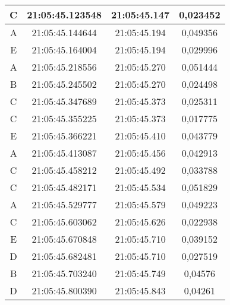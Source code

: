 \begin{table}[!h]
\begin{tabular}{|ccc|c|}
  \multicolumn{1}{|c|}{C}    & \multicolumn{1}{c|}{21:05:45.123548} & 21:05:45.147       & 0,023452      \\ \hline
  \multicolumn{1}{|c|}{A}    & \multicolumn{1}{c|}{21:05:45.144644} & 21:05:45.194       & 0,049356      \\ \hline
  \multicolumn{1}{|c|}{E}    & \multicolumn{1}{c|}{21:05:45.164004} & 21:05:45.194       & 0,029996      \\ \hline
  \multicolumn{1}{|c|}{A}    & \multicolumn{1}{c|}{21:05:45.218556} & 21:05:45.270       & 0,051444      \\ \hline
  \multicolumn{1}{|c|}{B}    & \multicolumn{1}{c|}{21:05:45.245502} & 21:05:45.270       & 0,024498      \\ \hline
  \multicolumn{1}{|c|}{C}    & \multicolumn{1}{c|}{21:05:45.347689} & 21:05:45.373       & 0,025311      \\ \hline
  \multicolumn{1}{|c|}{C}    & \multicolumn{1}{c|}{21:05:45.355225} & 21:05:45.373       & 0,017775      \\ \hline
  \multicolumn{1}{|c|}{E}    & \multicolumn{1}{c|}{21:05:45.366221} & 21:05:45.410       & 0,043779      \\ \hline
  \multicolumn{1}{|c|}{A}    & \multicolumn{1}{c|}{21:05:45.413087} & 21:05:45.456       & 0,042913      \\ \hline
  \multicolumn{1}{|c|}{C}    & \multicolumn{1}{c|}{21:05:45.458212} & 21:05:45.492       & 0,033788      \\ \hline
  \multicolumn{1}{|c|}{C}    & \multicolumn{1}{c|}{21:05:45.482171} & 21:05:45.534       & 0,051829      \\ \hline
  \multicolumn{1}{|c|}{A}    & \multicolumn{1}{c|}{21:05:45.529777} & 21:05:45.579       & 0,049223      \\ \hline
  \multicolumn{1}{|c|}{C}    & \multicolumn{1}{c|}{21:05:45.603062} & 21:05:45.626       & 0,022938      \\ \hline
  \multicolumn{1}{|c|}{E}    & \multicolumn{1}{c|}{21:05:45.670848} & 21:05:45.710       & 0,039152      \\ \hline
  \multicolumn{1}{|c|}{D}    & \multicolumn{1}{c|}{21:05:45.682481} & 21:05:45.710       & 0,027519      \\ \hline
  \multicolumn{1}{|c|}{B}    & \multicolumn{1}{c|}{21:05:45.703240} & 21:05:45.749       & 0,04576       \\ \hline
  \multicolumn{1}{|c|}{D}    & \multicolumn{1}{c|}{21:05:45.800390} & 21:05:45.843       & 0,04261       \\ \hline

\end{tabular}
\end{table}
